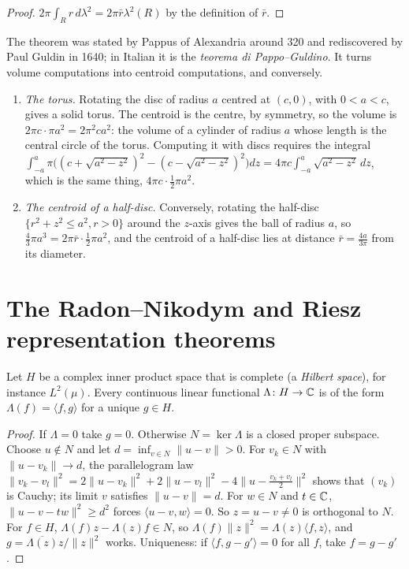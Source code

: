 \begin{proof}
$2\pi\int_Rr\,d\lambda^2 = 2\pi\bar r\lambda^2(R)$ by the definition of $\bar r$.
\end{proof}

The theorem was stated by Pappus of Alexandria around 320 and rediscovered by Paul Guldin in 1640; in Italian it is the \emph{teorema di Pappo--Guldino}. It turns volume computations into centroid
computations, and conversely.

\begin{example}\label{measure-theory:example-pappus-volume}
\begin{enumerate}
\item \emph{The torus.} Rotating the disc of radius $a$ centred at $(c, 0)$, with $0 < a < c$, gives a solid torus. The centroid is the centre, by symmetry, so the volume is $2\pi c \cdot \pi a^2 = 2\pi^2ca^2$: the
volume of a cylinder of radius $a$ whose length is the central circle of the torus. Computing it with discs requires the integral $\int_{-a}^a\pi\bigl((c + \sqrt{a^2 - z^2})^2 - (c - \sqrt{a^2 - z^2})^2\bigr)dz =
4\pi c\int_{-a}^a\sqrt{a^2 - z^2}\,dz$, which is the same thing, $4\pi c \cdot \frac12\pi a^2$.
\item \emph{The centroid of a half-disc.} Conversely, rotating the half-disc $\{r^2 + z^2 \leq a^2, r > 0\}$ around the $z$-axis gives the ball of radius $a$, so $\frac43\pi a^3 = 2\pi\bar r \cdot \frac12\pi a^2$, and the
centroid of a half-disc lies at distance $\bar r = \frac{4a}{3\pi}$ from its diameter.
\end{enumerate}
\end{example}

\section{The Radon--Nikodym and Riesz representation theorems}\label{measure-theory:section-radon-nikodym}

\begin{lemma}\label{measure-theory:lemma-hilbert-riesz}
Let $H$ be a complex inner product space that is complete (a \emph{Hilbert space}), for instance $L^2(\mu)$. Every continuous linear functional $\Lambda \colon H \to \mathbb{C}$ is of the form $\Lambda(f) = \langle f, g \rangle$
for a unique $g \in H$.
\end{lemma}

\begin{proof}
If $\Lambda = 0$ take $g = 0$. Otherwise $N = \ker\Lambda$ is a closed proper subspace. Choose $u \notin N$ and let $d = \inf_{v \in N}\|u - v\| > 0$. For $v_k \in N$ with $\|u - v_k\| \to d$, the parallelogram law
$\|v_k - v_l\|^2 = 2\|u - v_k\|^2 + 2\|u - v_l\|^2 - 4\|u - \frac{v_k + v_l}{2}\|^2$ shows that $(v_k)$ is Cauchy; its limit $v$ satisfies $\|u - v\| = d$. For $w \in N$ and $t \in \mathbb{C}$,
$\|u - v - tw\|^2 \geq d^2$ forces $\langle u - v, w \rangle = 0$. So $z = u - v \neq 0$ is orthogonal to $N$. For $f \in H$, $\Lambda(f)z - \Lambda(z)f \in N$, so $\Lambda(f)\|z\|^2 = \Lambda(z)\langle f, z \rangle$, and
$g = \overline{\Lambda(z)}z/\|z\|^2$ works. Uniqueness: if $\langle f, g - g' \rangle = 0$ for all $f$, take $f = g - g'$.
\end{proof}

